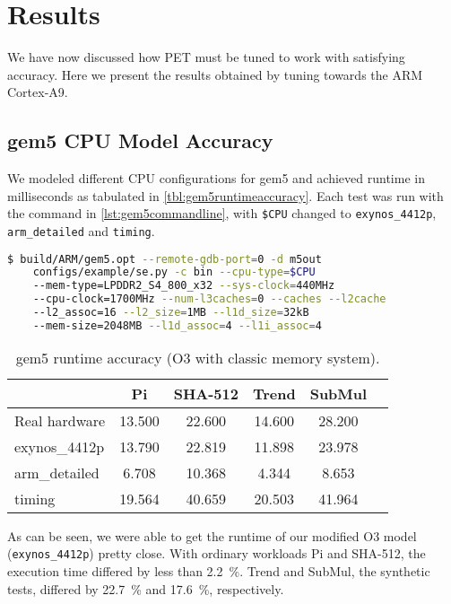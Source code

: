 \section{Results}

We have now discussed how PET must be tuned to work with satisfying accuracy.
Here we present the results obtained by tuning towards the ARM Cortex-A9.

\subsection{gem5 CPU Model Accuracy}

We modeled different CPU configurations for gem5 and achieved runtime in
milliseconds as tabulated in \autoref{tbl:gem5runtimeaccuracy}. Each test was
run with the command in \autoref{lst:gem5commandline}, with \texttt{\$CPU}
changed to \texttt{exynos\_4412p}, \texttt{arm\_detailed} and \texttt{timing}.

\begin{lstlisting}[float=htb,language=sh,numbers=none,label={lst:gem5commandline},caption={gem5
Command Line.}]
$ build/ARM/gem5.opt --remote-gdb-port=0 -d m5out
    configs/example/se.py -c bin --cpu-type=$CPU
    --mem-type=LPDDR2_S4_800_x32 --sys-clock=440MHz
    --cpu-clock=1700MHz --num-l3caches=0 --caches --l2cache
    --l2_assoc=16 --l2_size=1MB --l1d_size=32kB
    --mem-size=2048MB --l1d_assoc=4 --l1i_assoc=4
\end{lstlisting}

\begin{table}[ht]
\centering
\begin{tabular}{|l|c|c|c|c|c|}
\hline
                & Pi      & SHA-512 & Trend   & SubMul \\
\hline
Real hardware   & 13.500  & 22.600  & 14.600  & 28.200 \\
exynos\_4412p   & 13.790  & 22.819  & 11.898  & 23.978 \\
arm\_detailed   &  6.708  & 10.368  &  4.344  &  8.653 \\
timing          & 19.564  & 40.659  & 20.503  & 41.964 \\
\hline
\end{tabular}
\caption{gem5 runtime accuracy (O3 with classic memory system).}
\label{tbl:gem5runtimeaccuracy}
\end{table}

As can be seen, we were able to get the runtime of our modified O3
model (\texttt{exynos\_4412p}) pretty close. With ordinary workloads Pi and
SHA-512, the execution time differed by less
than 2.2~\%. Trend and SubMul, the synthetic tests, differed by 22.7~\% and
17.6~\%, respectively.



